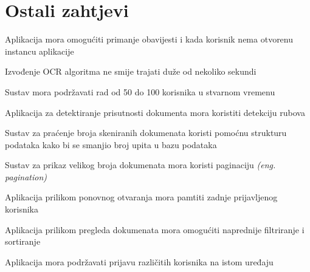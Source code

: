		\section{Ostali zahtjevi}
		\begin{packed_item}
			\item{Aplikacija mora omogućiti primanje obavijesti i kada korisnik nema otvorenu instancu aplikacije}
			\item{Izvođenje OCR algoritma ne smije trajati duže od nekoliko sekundi}
			\item{Sustav mora podržavati rad od 50 do 100 korisnika u stvarnom vremenu}
			\item{Aplikacija za detektiranje prisutnosti dokumenta mora koristiti detekciju rubova}
			\item{Sustav za praćenje broja skeniranih dokumenata koristi pomoćnu strukturu podataka kako bi se smanjio broj upita u bazu podataka}
			\item{Sustav za prikaz velikog broja dokumenata mora koristi paginaciju \textit{(eng. pagination)}}
			\item{Aplikacija prilikom ponovnog otvaranja mora pamtiti zadnje prijavljenog korisnika}
			\item{Aplikacija prilikom pregleda dokumenata mora omogućiti naprednije filtriranje i sortiranje}
			\item{Aplikacija mora podržavati prijavu različitih korisnika na istom uređaju}
		\end{packed_item}
			
			 
			 
			 
	